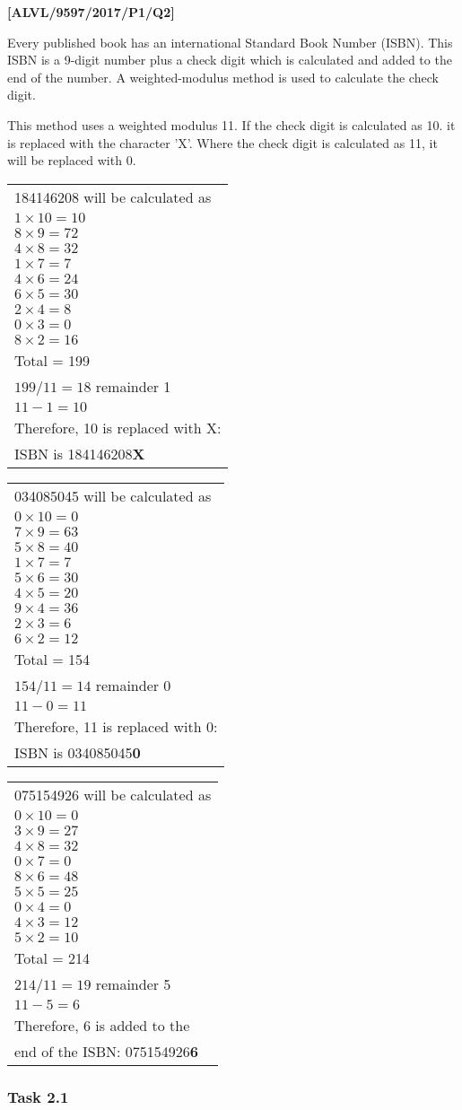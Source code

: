 \item \textbf{{[}ALVL/9597/2017/P1/Q2{]} }

Every published book has an international Standard Book Number (ISBN).
This ISBN is a 9-digit number plus a check digit which is calculated
and added to the end of the number. A weighted-modulus method is used
to calculate the check digit. 

This method uses a weighted modulus 11. If the check digit is calculated
as 10. it is replaced with the character 'X'. Where the check digit
is calculated as 11, it will be replaced with 0. 

\noindent %
\begin{tabular}{l}
184146208 will be calculated as\tabularnewline
$1\times10=10$\tabularnewline
$8\times9=72$\tabularnewline
$4\times8=32$\tabularnewline
$1\times7=7$\tabularnewline
$4\times6=24$\tabularnewline
$6\times5=30$\tabularnewline
$2\times4=8$\tabularnewline
$0\times3=0$\tabularnewline
$8\times2=16$\tabularnewline
Total = 199\tabularnewline
$199/11=18$ remainder 1\tabularnewline
$11-1=10$\tabularnewline
Therefore, 10 is replaced with X:\tabularnewline
ISBN is 184146208\textbf{X}\tabularnewline
\end{tabular}%
\begin{tabular}{l}
034085045 will be calculated as\tabularnewline
$0\times10=0$\tabularnewline
$7\times9=63$\tabularnewline
$5\times8=40$\tabularnewline
$1\times7=7$\tabularnewline
$5\times6=30$\tabularnewline
$4\times5=20$\tabularnewline
$9\times4=36$\tabularnewline
$2\times3=6$\tabularnewline
$6\times2=12$\tabularnewline
Total = 154\tabularnewline
$154/11=14$ remainder 0\tabularnewline
$11-0=11$\tabularnewline
Therefore, 11 is replaced with 0:\tabularnewline
ISBN is 034085045\textbf{0}\tabularnewline
\end{tabular}%
\begin{tabular}{l}
075154926 will be calculated as\tabularnewline
$0\times10=0$\tabularnewline
$3\times9=27$\tabularnewline
$4\times8=32$\tabularnewline
$0\times7=0$\tabularnewline
$8\times6=48$\tabularnewline
$5\times5=25$\tabularnewline
$0\times4=0$\tabularnewline
$4\times3=12$\tabularnewline
$5\times2=10$\tabularnewline
Total = 214\tabularnewline
$214/11=19$ remainder 5\tabularnewline
$11-5=6$\tabularnewline
Therefore, 6 is added to the\tabularnewline
end of the ISBN: 075154926\textbf{6} \tabularnewline
\end{tabular}

\subsubsection*{Task 2.1}

